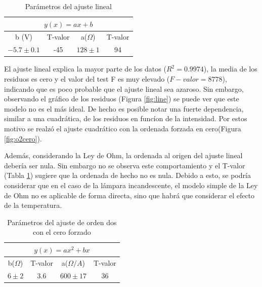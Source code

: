 \documentclass[twoside,twocolumn,a4paper]{article}
\begin{document}
\begin{table}[h]
\centering
\caption{Par\'ametros del ajuste lineal}
\label{tab:line}
\begin{tabular}{|c|c|c|c|}
\hline
\multicolumn{4}{|c|}{$y(x)=ax+b$}           \\ \hline
b (V)        & T-valor & a($\Omega$) & T-valor \\ \hline
$-5.7\pm0.1$ & -45     & $128\pm1$   & 94      \\ \hline
\end{tabular}
\end{table}

El ajuste lineal explica la mayor parte de los datos ($R^2=0.9974$), la media de los residuos es cero y el valor del test F es muy elevado ($F-valor=8778$), indicando que es poco probable que el ajuste lineal sea azaroso. Sin embargo, observando el gr\'afico de los residuos (Figura \ref{fig:line}) se puede ver que este modelo no es el m\'as ideal. De hecho es posible notar una fuerte dependencia, similar a una cuadr\'atica, de los residuos en func\'ion de la intensidad. Por estos motivo se realz\'o el ajuste cuadr\'atico con la ordenada forzada en cero(Figura \ref{fig:o2cero}).\par
Adem\'as, considerando la Ley de Ohm, la ordenada al origen del ajuste lineal deber\'ia ser nula. Sin embargo no se observa este comportamiento y el T-valor (Tabla \ref{tab:line}) sugiere que la ordenada de hecho no es nula. Debido a esto, se podr\'ia considerar que en el caso de la l\'ampara incandescente, el modelo simple de la Ley de Ohm no es aplicable de forma directa, sino que habr\'a que considerar el efecto de la temperatura.


\begin{table}[h]
\centering
\caption{Par\'ametros del ajuste de orden dos con el cero forzado}
\label{tab:o20}
\begin{tabular}{|c|c|c|c|}
\hline
\multicolumn{4}{|c|}{$y(x)=ax^2+bx$}   \\ \hline
b($\Omega$)& T-valor & a($\Omega/A$) & T-valor \\ \hline
$6\pm2$	   & 3.6     & $600\pm17$    & 36     \\ \hline
\end{tabular}
\end{table}
\end{document}
